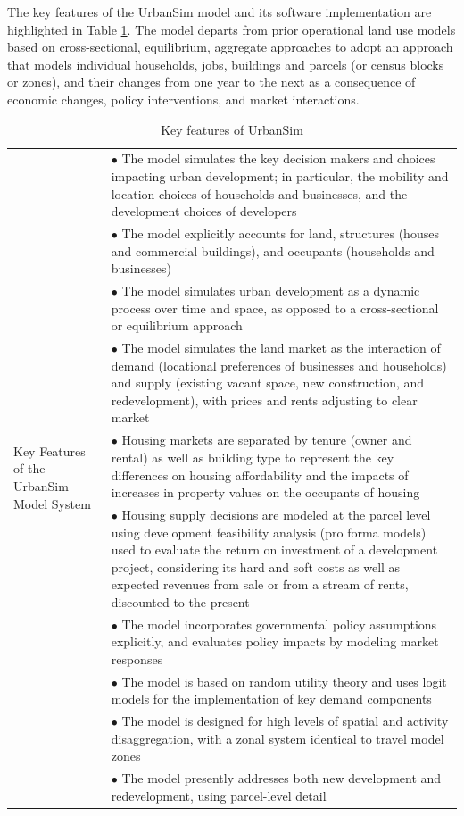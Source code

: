 The key features of the UrbanSim model and its software implementation are highlighted in Table \ref{tab:key-features}. The model departs from prior operational land use models based on cross-sectional, equilibrium, aggregate approaches to adopt an approach that models individual households, jobs, buildings and parcels (or census blocks or zones), and their changes from one year to the next as a consequence of economic changes, policy interventions, and market interactions.

\begin{table}[htbp]
    \caption{Key features of UrbanSim}
    \label{tab:key-features}
    \begin{center}
    \begin{tabular}{ p{} p{} }
    \toprule
    
    \multirow[c]{10}{0.25\textwidth}{Key Features of the UrbanSim Model System} & $\bullet$ The model simulates the key decision makers and choices impacting urban development; in particular, the mobility and location choices of households and businesses, and the development choices of developers\\
    & $\bullet$ The model explicitly accounts for land, structures (houses and commercial buildings), and occupants (households and businesses)\\
    & $\bullet$ The model simulates urban development as a dynamic process over time and space, as opposed to a cross-sectional or equilibrium approach\\
    & $\bullet$ The model simulates the land market as the interaction of demand (locational preferences of businesses and households) and supply (existing vacant space, new construction, and redevelopment), with prices and rents adjusting to clear market\\
    & $\bullet$ Housing markets are separated by tenure (owner and rental) as well as building type to represent the key differences on housing affordability and the impacts of increases in property values on the occupants of housing\\
    & $\bullet$ Housing supply decisions are modeled at the parcel level using development feasibility analysis (pro forma models) used to evaluate the return on investment of a development project, considering its hard and soft costs as well as expected revenues from sale or from a stream of rents, discounted to the present\\
    & $\bullet$ The model incorporates governmental policy assumptions explicitly, and evaluates policy impacts by modeling market responses\\
    & $\bullet$ The model is based on random utility theory and uses logit models for the implementation of key demand components\\
    & $\bullet$ The model is designed for high levels of spatial and activity disaggregation, with a zonal system identical to travel model zones\\
    & $\bullet$ The model presently addresses both new development and redevelopment, using parcel-level detail\\
    

\end{tabular}
\end{center}
\end{table}
